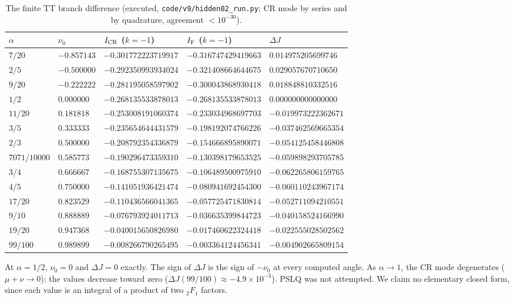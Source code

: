 \documentclass[11pt,a4paper]{article}
\newcommand{\loc}[1]{\nolinkurl{#1}}
\theoremstyle{plain}
\theoremstyle{definition}
\theoremstyle{remark}
\numberwithin{equation}{section}
\begin{document}
\begin{center}
\scriptsize
\begin{longtable}{@{}lllll@{}}
\caption{The finite TT branch difference (executed, \loc{code/v9/hidden02_run.py}; CR mode by series and by quadrature, agreement \(<10^{-30}\)).}\label{tab:v9dJ}\\
\toprule
\(\alpha\) & \(\nu_0\) & \(I_{\rm CR}\) (\(k=-1\)) & \(I_{\rm F}\) (\(k=-1\)) & \(\Delta J\)\\
\midrule
\(7/20\) & \(-0.857143\) & \(-0.301772223719917\) & \(-0.316747429419663\) & \(0.014975205699746\)\\
\(2/5\) & \(-0.500000\) & \(-0.292350993934024\) & \(-0.321408664644675\) & \(0.029057670710650\)\\
\(9/20\) & \(-0.222222\) & \(-0.281195058597902\) & \(-0.300043868930418\) & \(0.018848810332516\)\\
\(1/2\) & \(0.000000\) & \(-0.268135533878013\) & \(-0.268135533878013\) & \(0.000000000000000\)\\
\(11/20\) & \(0.181818\) & \(-0.253008191060374\) & \(-0.233034968697703\) & \(-0.019973222362671\)\\
\(3/5\) & \(0.333333\) & \(-0.235654644431579\) & \(-0.198192074766226\) & \(-0.037462569665354\)\\
\(2/3\) & \(0.500000\) & \(-0.208792354336879\) & \(-0.154666895890071\) & \(-0.054125458446808\)\\
\(7071/10000\) & \(0.585773\) & \(-0.190296473359310\) & \(-0.130398179653525\) & \(-0.059898293705785\)\\
\(3/4\) & \(0.666667\) & \(-0.168755307135675\) & \(-0.106489500975910\) & \(-0.062265806159765\)\\
\(4/5\) & \(0.750000\) & \(-0.141051936421474\) & \(-0.080941692454300\) & \(-0.060110243967174\)\\
\(17/20\) & \(0.823529\) & \(-0.110436566041365\) & \(-0.057725471830814\) & \(-0.052711094210551\)\\
\(9/10\) & \(0.888889\) & \(-0.076793924011713\) & \(-0.036635399844723\) & \(-0.040158524166990\)\\
\(19/20\) & \(0.947368\) & \(-0.040015650826980\) & \(-0.017460622324418\) & \(-0.022555028502562\)\\
\(99/100\) & \(0.989899\) & \(-0.008266790265495\) & \(-0.003364124456341\) & \(-0.004902665809154\)\\
\bottomrule
\end{longtable}
\end{center}
At \(\alpha=1/2\), \(\nu_0=0\) and \(\Delta J=0\) exactly. The sign
of \(\Delta J\) is the sign of \(-\nu_0\) at every computed angle.
As \(\alpha\to1\), the CR mode degenerates (\(\mu+\nu\to0\)); the
values decrease toward zero (\(\Delta J(99/100)\approx-4.9\times10^{-3}\)).
PSLQ was not attempted. We claim no elementary
closed form, since each value is an integral of a product of two
\({}_2F_1\) factors.
\end{document}
